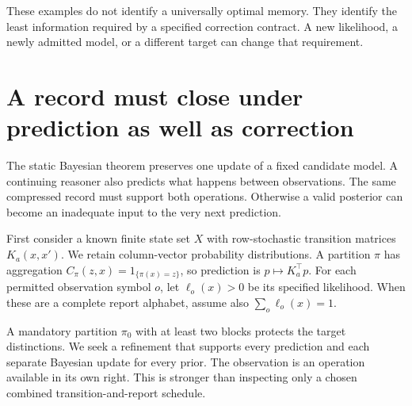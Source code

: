 \documentclass[11pt,oneside,openany]{book}
\theoremstyle{definition}\newtheorem{definition}[theorem]{Definition}
\begin{document}
These examples do not identify a universally optimal memory. They identify the least information required by a specified correction contract. A new likelihood, a newly admitted model, or a different target can change that requirement.


\section{A record must close under prediction as well as correction}
The static Bayesian theorem preserves one update of a fixed candidate model. A continuing reasoner also predicts what happens between observations. The same compressed record must support both operations. Otherwise a valid posterior can become an inadequate input to the very next prediction.

First consider a known finite state set $X$ with row-stochastic transition matrices $K_a(x,x')$. We retain column-vector probability distributions. A partition $\pi$ has aggregation $C_\pi(z,x)=1_{\{\pi(x)=z\}}$, so prediction is $p\mapsto K_a^\top p$. For each permitted observation symbol $o$, let $\ell_o(x)>0$ be its specified likelihood. When these are a complete report alphabet, assume also $\sum_o\ell_o(x)=1$.

A mandatory partition $\pi_0$ with at least two blocks protects the target distinctions. We seek a refinement that supports every prediction and each separate Bayesian update for every prior. The observation is an operation available in its own right. This is stronger than inspecting only a chosen combined transition-and-report schedule.
\end{document}

